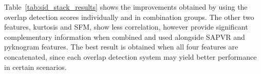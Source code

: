{Table~\ref{tab:sid_stack_results} shows the improvements obtained by using the overlap detection scores individually and in combination groups. 
The other two features, kurtosis and SFM, show less correlation, however provide significant complementary information when combined and used alongside SAPVR and pyknogram features. 
The best result is obtained when all four features are concatenated, since each overlap detection system may yield better performance in certain scenarios.  



}
